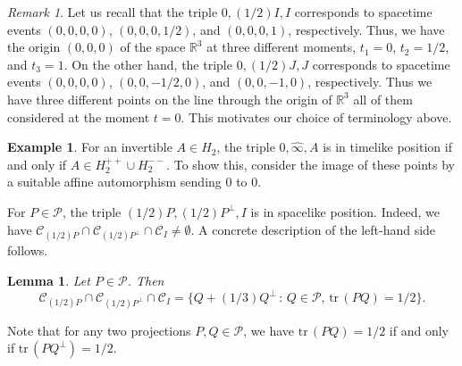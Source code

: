 \documentclass[10pt]{amsart}
\newtheorem{lemma}[theorem]{Lemma}
\theoremstyle{definition}
\newtheorem{example}[theorem]{Example}
\theoremstyle{remark}
\newtheorem{remark}[theorem]{Remark}
\numberwithin{subsection}{section}
\numberwithin{equation}{section}
\newcommand\cP{{\mathcal{P}}}
\newcommand\oi{{\widehat{\infty}}}
\begin{document}
\begin{remark}\label{remark02}
Let us recall that the triple $0, (1/2)I, I$ corresponds to spacetime events $(0,0,0,0)$, $(0,0,0,1/2)$, and $(0,0,0,1)$, respectively. Thus, we have the origin $(0,0,0)$ of the space $\mathbb{R}^3$ at three different moments, $t_1 =0$, $t_2 = 1/2$, and $t_3 = 1$.  
On the other hand, the triple $0, (1/2)J, J$ corresponds to spacetime events $(0,0,0,0)$, $(0,0,-1/2, 0)$, and $(0,0,-1,0)$, respectively. Thus we have three different points on the line through the origin of $\mathbb{R}^3$ all of them considered at the moment $t=0$. 
This motivates our choice of terminology above.
\end{remark}

\begin{example}\label{definite}
For an invertible $A\in H_2$, the triple $0, \oi, A$ is in timelike position if and only if $A\in H_2^{++}\cup H_2^{--}$. 
To show this, consider the image of these points by a suitable affine automorphism sending $0$ to $0$.
\end{example}


For $P\in \cP$, the triple $(1/2)P, (1/2)P^\perp, I$ is in spacelike position. Indeed, we have $\mathcal{C}_{(1/2)P} \cap \mathcal{C}_{(1/2)P^\perp} \cap \mathcal{C}_I\neq \emptyset$. 
A concrete description of the left-hand side follows.
\begin{lemma}\label{nnjk}
Let $P \in \mathcal{P}$. Then
\[
\mathcal{C}_{(1/2)P} \cap \mathcal{C}_{(1/2)P^\perp} \cap \mathcal{C}_I = \{ Q + (1/3)Q^\perp \, : \, Q\in \mathcal{P}, \, \mathrm{tr}\, (PQ) = 1/2 \}.
\]
\end{lemma}

Note that for any two projections $P,Q \in \mathcal{P}$, we have $\mathrm{tr}\, (PQ) = 1/2$ if and only if $\mathrm{tr}\, (PQ^\perp) = 1/2$.
\end{document}
